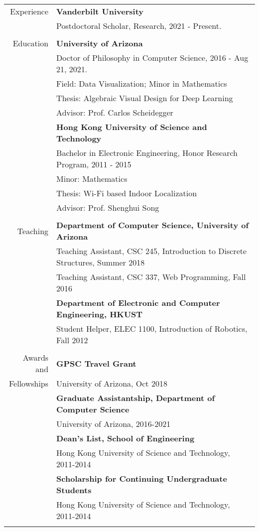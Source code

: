 \documentclass[letterpaper,11pt,oneside]{article}
\begin{document}
\noindent \begin{tabular}{@{} r l}
\Large{Experience}    & \textbf{Vanderbilt University} \\
    & Postdoctoral Scholar, Research, 2021 - Present. \\
    & \\
\Large{Education}    & \textbf{University of Arizona} \\

    & Doctor of Philosophy in Computer Science, 2016 - Aug 21, 2021. \\
    & Field: Data Visualization; Minor in Mathematics \\
    & Thesis: Algebraic Visual Design for Deep Learning \\
    & Advisor: Prof. Carlos Scheidegger \\
    & \textbf{Hong Kong University of Science and Technology} \\
    & Bachelor in Electronic Engineering, Honor Research Program, 2011 - 2015 \\
    & Minor: Mathematics \\
    & Thesis: Wi-Fi based Indoor Localization \\
    & Advisor: Prof. Shenghui Song \\
    & \\

\Large{Teaching}   & \textbf{Department of Computer Science, University of Arizona} \\
    & Teaching Assistant, CSC 245, Introduction to Discrete Structures, Summer 2018 \\
    & Teaching Assistant, CSC 337, Web Programming, Fall 2016 \\
    &\textbf{Department of Electronic and Computer Engineering, HKUST} \\
    & Student Helper, ELEC 1100, Introduction of Robotics, Fall 2012 \\
    & \\

\Large{Awards and}
    & \textbf{GPSC Travel Grant} \\
\Large{Fellowships} 
    & University of Arizona, Oct 2018 \\
    & \textbf{Graduate Assistantship, Department of Computer Science} \\
    & University of Arizona, 2016-2021 \\
    & \textbf{Dean’s List, School of Engineering} \\
    & Hong Kong University of Science and Technology, 2011-2014 \\
    & \textbf{Scholarship for Continuing Undergraduate Students} \\
    & Hong Kong University of Science and Technology, 2011-2014 \\
    \\
    

\end{tabular}
\end{document}
